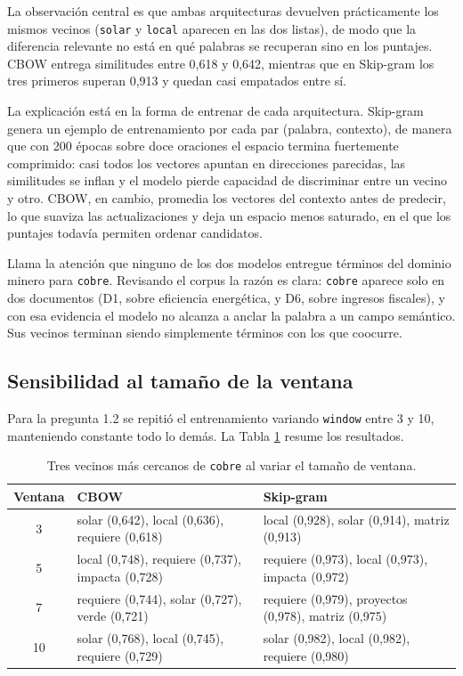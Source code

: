 \documentclass[12pt, a4paper]{article}
\newcommand{\code}[1]{\texttt{#1}}
\begin{document}
La observación central es que ambas arquitecturas devuelven prácticamente los mismos vecinos
(\code{solar} y \code{local} aparecen en las dos listas), de modo que la diferencia relevante no está
en qué palabras se recuperan sino en los puntajes. CBOW entrega similitudes entre 0,618 y 0,642,
mientras que en Skip-gram los tres primeros superan 0,913 y quedan casi empatados entre sí.

La explicación está en la forma de entrenar de cada arquitectura. Skip-gram genera un ejemplo de
entrenamiento por cada par (palabra, contexto), de manera que con 200 épocas sobre doce oraciones el
espacio termina fuertemente comprimido: casi todos los vectores apuntan en direcciones parecidas,
las similitudes se inflan y el modelo pierde capacidad de discriminar entre un vecino y otro. CBOW,
en cambio, promedia los vectores del contexto antes de predecir, lo que suaviza las actualizaciones y
deja un espacio menos saturado, en el que los puntajes todavía permiten ordenar candidatos.

Llama la atención que ninguno de los dos modelos entregue términos del dominio minero para
\code{cobre}. Revisando el corpus la razón es clara: \code{cobre} aparece solo en dos documentos (D1,
sobre eficiencia energética, y D6, sobre ingresos fiscales), y con esa evidencia el modelo no alcanza
a anclar la palabra a un campo semántico. Sus vecinos terminan siendo simplemente términos con los
que coocurre.

\subsection{Sensibilidad al tamaño de la ventana}

Para la pregunta 1.2 se repitió el entrenamiento variando \code{window} entre 3 y 10, manteniendo
constante todo lo demás. La Tabla \ref{tab:window} resume los resultados.

\begin{table}[H]
\centering
\caption{Tres vecinos más cercanos de \code{cobre} al variar el tamaño de ventana.}
\label{tab:window}
\small
\renewcommand{\arraystretch}{1.2}
\begin{tabular}{@{}c>{\raggedright\arraybackslash}p{5.4cm}>{\raggedright\arraybackslash}p{5.4cm}@{}}
\toprule
\textbf{Ventana} & \textbf{CBOW} & \textbf{Skip-gram} \\
\midrule
3  & solar (0,642), local (0,636), requiere (0,618)   & local (0,928), solar (0,914), matriz (0,913) \\
5  & local (0,748), requiere (0,737), impacta (0,728) & requiere (0,973), local (0,973), impacta (0,972) \\
7  & requiere (0,744), solar (0,727), verde (0,721)   & requiere (0,979), proyectos (0,978), matriz (0,975) \\
10 & solar (0,768), local (0,745), requiere (0,729)   & solar (0,982), local (0,982), requiere (0,980) \\
\bottomrule
\end{tabular}
\end{table}
\end{document}
